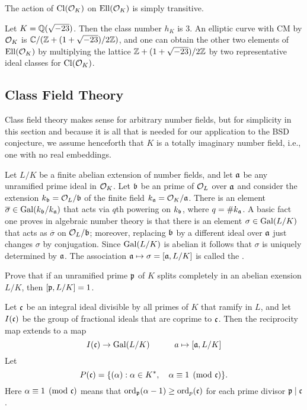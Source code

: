 \begin{theorem}
The action of $\operatorname{Cl}(\mathcal{O}_K)$ on $\operatorname{Ell}(\mathcal{O}_K)$
is simply transitive.
\end{theorem}

\begin{example}
Let $K=\mathbb{Q}(\sqrt{-23})$.  Then the class number $h_K$ is $3$.
An elliptic curve with CM by $\mathcal{O}_K$ is $\mathbb{C}/(\mathbb{Z}+(1+\sqrt{-23})/2 \mathbb{Z})$,
and one can obtain the other two elements of $\operatorname{Ell}(\mathcal{O}_K)$ 
by multiplying
the lattice $\mathbb{Z}+(1+\sqrt{-23})/2 \mathbb{Z}$ by two representative ideal
classes for $\operatorname{Cl}(\mathcal{O}_K)$.
\end{example}

\subsection{Class Field Theory}

Class field theory makes sense for arbitrary number fields, but for
simplicity in this section and because it is all that is needed for
our application to the BSD conjecture, we assume henceforth that $K$
is a totally imaginary number field, i.e., one with no real
embeddings.


Let $L/K$ be a finite abelian extension of number fields, and let $\mathfrak{a}$
be any unramified prime ideal in $\mathcal{O}_K$.  Let $\mathfrak{b}$ be an prime of
$\mathcal{O}_L$ over $\mathfrak{a}$ and consider the extension $k_{\mathfrak{b}} = \mathcal{O}_L/\mathfrak{b}$ of the
finite field $k_{\mathfrak{a}}=\mathcal{O}_K/\mathfrak{a}$.  There is an element $\overline{\sigma}
\in \operatorname{Gal}(k_{\mathfrak{b}}/k_{\mathfrak{a}})$ that acts via $q$th powering on $k_{\mathfrak{b}}$, where
$q=\#k_{\mathfrak{a}}$.  A basic fact one proves in algebraic number theory is
that there is an element $\sigma \in \operatorname{Gal}(L/K)$ that acts as
$\overline{\sigma}$ on $\mathcal{O}_L/\mathfrak{b}$; moreover, replacing $\mathfrak{b}$ by a
different ideal over $\mathfrak{a}$ just changes $\sigma$ by conjugation. Since
$\operatorname{Gal}(L/K)$ is abelian it follows that $\sigma$ is uniquely determined
by $\mathfrak{a}$.  The association $\mathfrak{a} \mapsto \sigma = [\mathfrak{a}, L/K]$ is called
the .

\begin{exercise}
Prove that if an unramified prime $\mathfrak{p}$ of $K$ splits completely
in an abelian exension $L/K$, then $[\mathfrak{p},L/K] = 1$.
\end{exercise}

Let $\mathfrak{c}$ be an integral
ideal divisible by all primes of $K$ that ramify in $L$, and let
$I(\mathfrak{c})$ be the group of fractional ideals that are coprime to $\mathfrak{c}$.
Then the reciprocity map extends to a map 
$$
  I(\mathfrak{c}) \to \operatorname{Gal}(L/K)\qquad \quad a\mapsto [\mathfrak{a},L/K]
$$
Let 
$$
 P(\mathfrak{c}) = \{(\alpha) : \alpha \in K^*,\quad \alpha\equiv 1 \pmod{\mathfrak{c}}\}.
$$
Here $\alpha \equiv 1\pmod{\mathfrak{c}}$ means that $\operatorname{ord}_{\mathfrak{p}}(\alpha-1) \geq \operatorname{ord}_p(\mathfrak{c})$
for each prime divisor $\mathfrak{p}\mid \mathfrak{c}$.

